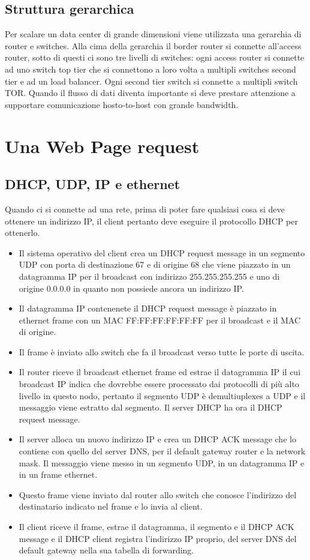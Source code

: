 \subsection{Struttura gerarchica}
Per scalare un data center di grande dimensioni viene utilizzata una gerarchia di router e switches. Alla cima della gerarchia il border router si connette all'access router, sotto di questi ci sono tre livelli di 
switches: ogni access router si connette ad uno switch top tier che si connettono a loro volta a multipli switches second tier e ad un load balancer. Ogni second tier switch si connette a multipli switch TOR. 
Quando il flusso di dati diventa importante si deve prestare attenzione a supportare comunicazione hosto-to-host con grande bandwidth. 
\section{Una Web Page request}
\subsection{DHCP, UDP, IP e ethernet}
Quando ci si connette ad una rete, prima di poter fare qualsiasi cosa si deve ottenere un indirizzo IP, il client pertanto deve eseguire il protocollo DHCP per ottenerlo.
\begin{itemize}
\item Il sistema operativo del client crea un DHCP request message in un segmento UDP con porta di destinazione 67 e di origine 68 che viene piazzato in un datagramma IP per il broadcast con indirizzo 
255.255.255.255 e uno di origine 0.0.0.0 in quanto non possiede ancora un indirizzo IP.
\item Il datagramma IP contenenete il DHCP request message \`e piazzato in ethernet frame con un MAC FF:FF:FF:FF:FF:FF per il broadcast e il MAC di origine. 
\item Il frame \`e inviato allo switch che fa il broadcast verso tutte le porte di uscita. 
\item Il router riceve il broadcast ethernet frame ed estrae il datagramma IP il cui broadcast IP indica che dovrebbe essere processato dai protocolli di pi\`u alto livello in questo nodo, pertanto il segmento UDP
\`e demultiuplexes a UDP e il messaggio viene estratto dal segmento. Il server DHCP ha ora il DHCP request message.
\item Il server alloca un nuovo indirizzo IP e crea un DHCP ACK message che lo contiene con quello del server DNS, per il default gateway router e la network mask. Il messaggio viene messo in un segmento 
UDP, in un datagramma IP e in un frame ethernet. 
\item Questo frame viene inviato dal router allo switch che conosce l'indirizzo del destinatario indicato nel frame e lo invia al client.
\item Il client riceve il frame, estrae il datagramma, il segmento e il DHCP ACK message e il DHCP client registra l'indirizzo IP proprio, del server DNS del default gateway nella sua tabella di forwarding. 
\end{itemize}
